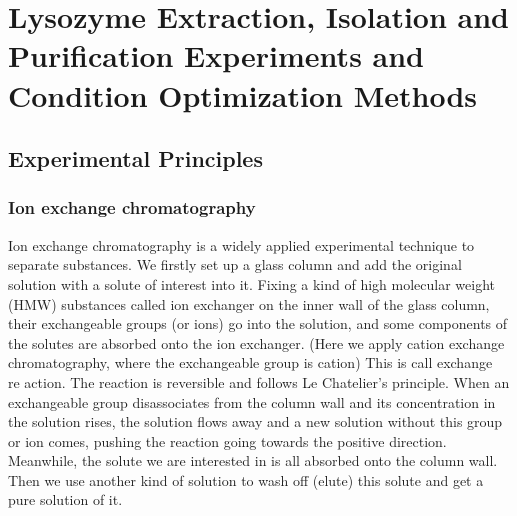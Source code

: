 % 
%
%
% 
%

\chapter{Lysozyme Extraction, Isolation and Purification Experiments and Condition Optimization Methods}

\section{Experimental Principles}
\subsection{Ion exchange chromatography}

Ion exchange chromatography is a widely applied experimental technique to separate substances. We firstly set up a glass column and add the original solution with a solute of interest
into it. Fixing a kind of high molecular weight (HMW) substances called ion exchanger on
the inner wall of the glass column, their exchangeable groups (or ions) go into the solution, and
some components of the solutes are absorbed onto the ion exchanger. (Here we apply cation
exchange chromatography, where the exchangeable group is cation) This is call exchange re­
action. The reaction is reversible and follows Le Chatelier’s principle. When an exchangeable
group disassociates from the column wall and its concentration in the solution rises, the solu­tion flows away and a new solution without this group or ion comes, pushing the reaction going
towards the positive direction. Meanwhile, the solute we are interested in is all absorbed onto
the column wall. Then we use another kind of solution to wash off (elute) this solute and get a pure solution of it.

